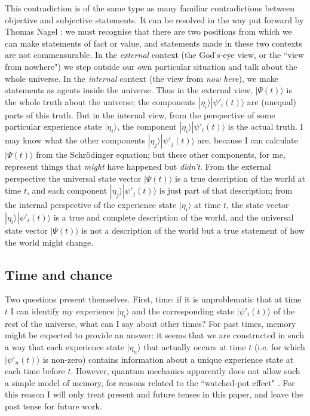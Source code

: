 \documentclass[12pt,reqno]{article}
\renewcommand{\(}{\left(}
\renewcommand{\)}{\right)}
\newcommand{\<}{\langle}
\renewcommand{\>}{\rangle}
\theoremstyle{plain} %
\begin{document}
This contradiction is of the same type as many familiar contradictions between objective and subjective statements. It can be resolved in the way put forward by Thomas Nagel \cite{Nagel:subjobj,Nagel:nowhere}: we must recognise that there are two positions from which we can make statements of fact or value, and statements made in these two contexts are not commensurable. In the \emph{external} context (the God's-eye view, or the ``view from nowhere") we step outside our own particular situation and talk about the whole universe. In the \emph{internal} context (the view from \emph{now here}), we make statements as agents inside the universe. Thus in the external view, $|\Psi(t)\>$ is the whole truth about the universe; the components $|\eta_i\>|\psi'_i(t)\>$ are (unequal) parts of this truth. But in the internal view, from the perspective of some particular experience state $|\eta_i\>$, the component $|\eta_i\>|\psi'_i(t)\>$ is the actual truth. I may know what the other components $|\eta_j\>|\psi'_j(t)\>$ are, because I can calculate $|\Psi(t)\>$ from the Schr\"odinger equation; but these other components, for me, represent things that \emph{might} have happened but \emph{didn't}. From the external perspective the universal state vector $|\Psi(t)\>$ is a true description of the world at time $t$, and each component $|\eta_j\>|\psi'_j(t)\>$ is just part of that description; from the internal perspective of the experience state $|\eta_i\>$ at time $t$, the state vector $|\eta_i\>|\psi'_i(t)\>$ is a true and complete description of the world, and the universal state vector $|\Psi(t)\>$ is not a description of the world but a true statement of how the world might change.

\subsection{Time and chance}
\label{subsec:tchance}

Two questions present themselves. First, time: if it is unproblematic that at time $t$ I can identify my experience $|\eta_i\>$ and the corresponding state $|\psi'_i(t)\>$ of the rest of the universe, what can I say about other times? For past times, memory might be expected to provide an answer: it seems that we are constructed in such a way that each experience state $|\eta_n\>$ that actually occurs at time $t$ (i.e. for which $|\psi'_n(t)\>$ is non-zero) contains information about a unique experience state at each time before $t$. However, quantum mechanics apparently does not allow such a simple model of memory, for reasons related to the ``watched-pot effect" \cite{MisraSuda, obsdecay}. For this reason I will only treat present and future tenses in this paper, and leave the past tense for future work.
\end{document}
